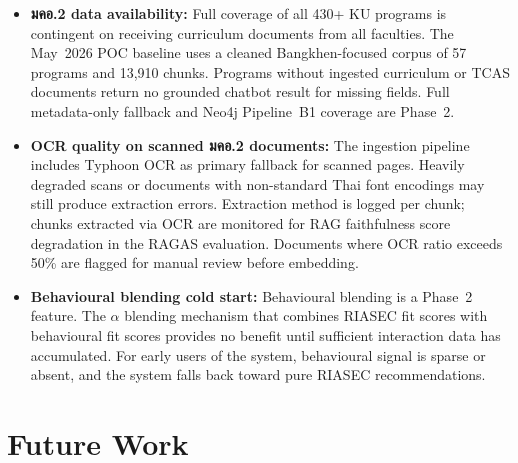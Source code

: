 \begin{itemize}[leftmargin=80pt]
    \item \textbf{มคอ.2 data availability:} Full coverage of all 430+ KU programs is contingent on receiving curriculum documents from all faculties. The May~2026 POC baseline uses a cleaned Bangkhen-focused corpus of 57 programs and 13,910 chunks. Programs without ingested curriculum or TCAS documents return no grounded chatbot result for missing fields. Full metadata-only fallback and Neo4j Pipeline~B1 coverage are Phase~2.

    \item \textbf{OCR quality on scanned มคอ.2 documents:} The ingestion pipeline includes Typhoon OCR as primary fallback for scanned pages. Heavily degraded scans or documents with non-standard Thai font encodings may still produce extraction errors. Extraction method is logged per chunk; chunks extracted via OCR are monitored for RAG faithfulness score degradation in the RAGAS evaluation. Documents where OCR ratio exceeds 50\% are flagged for manual review before embedding.

    \item \textbf{Behavioural blending cold start:} Behavioural blending is a Phase~2 feature. The $\alpha$ blending mechanism that combines RIASEC fit scores with behavioural fit scores provides no benefit until sufficient interaction data has accumulated. For early users of the system, behavioural signal is sparse or absent, and the system falls back toward pure RIASEC recommendations.
\end{itemize}

\section{Future Work}
\label{section:future-work}

